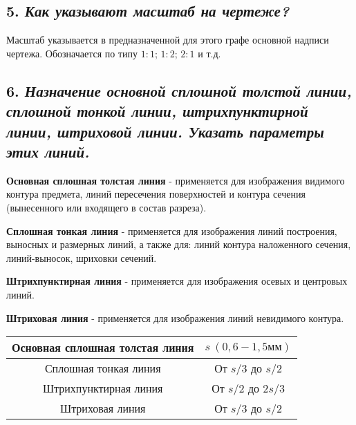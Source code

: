 \subsection*{5. \textit{Как указывают масштаб на чертеже?}}

Масштаб указывается в предназначенной для этого графе основной надписи чертежа. Обозначается по типу $1:1$; $1:2$; $2:1$ и т.д.
\subsection*{6. \textit{Назначение основной сплошной толстой линии, сплошной тонкой линии, штрихпунктирной линии, штриховой линии. Указать параметры этих линий.}}

\textbf{Основная сплошная толстая линия} - применяется для изображения видимого контура предмета, линий пересечения поверхностей и контура сечения (вынесенного или входящего в состав разреза).

\textbf{Сплошная тонкая линия} - применяется для изображения линий построения, выносных и размерных линий, а также для: линий контура наложенного сечения, линий-выносок, шриховки сечений.

\textbf{Штрихпунктирная линия} - применяется для изображения осевых и центровых линий.

\textbf{Штриховая линия} - применяется для изображения линий невидимого контура.



\vspace{14pt} 
\begin{center}
\begin{tabular}{|c|c|}
\hline




Основная сплошная толстая линия&$s\ (0,6 - 1,5\text{мм})$\\ \hline

Сплошная тонкая линия&От $s/3$ до $s/2$\\ \hline

Штрихпунктирная линия&От $s/2$ до $2s/3$\\ \hline

Штриховая линия&От $s/3$ до $s/2$\\ \hline

\hline
\end{tabular}
\end{center}
